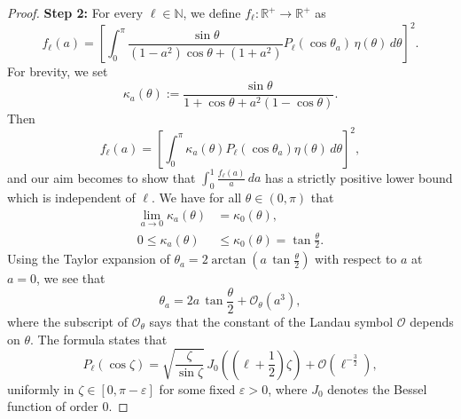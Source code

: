 \documentclass[a4paper,11pt,DIV=11,%
abstract=on%
]{scrartcl}
\def\N{{\mathbb N}}
\def\R{{\mathbb R}}
\begin{document}
\begin{proof}
	\vspace{0.3\baselineskip}\noindent
	\textbf{Step 2:}	For every $\ell\in\N$, we define $f_\ell:\R^+\to\R^+$ as 
	\begin{equation}\label{eq:f_ell}
		f_\ell(a)
		=\left[	\int_{0}^{\pi} 
		\frac{\sin\theta}{(1-a^2)\cos\theta+(1+a^2)} P_\ell(\cos\theta_a)\, \eta(\theta)\,
		d\theta \right]^2.
	\end{equation}
	For brevity, we set
	\begin{equation*}
		\kappa_a(\theta)
		:=\frac{\sin\theta}{1+\cos\theta+a^2(1-\cos\theta)}.
	\end{equation*}
	Then 
	$$f_\ell(a)
	=\left[ \int_0^\pi \kappa_a(\theta) P_\ell(\cos\theta_a) \eta(\theta)\, d\theta \right]^2,$$
	and our aim becomes to show that $\int_0^1 \frac{f_\ell(a)}{a} \,da$ has a strictly positive
	lower bound which is independent of $\ell$. We have for all $\theta\in(0,\pi)$ that
	\begin{align}
		\lim_{a\to 0}\kappa_a(\theta)
		&=\kappa_0(\theta)\label{eq:k-lim},\\
		0\leq \kappa_a(\theta)
		&\leq \kappa_0(\theta)=\tan\frac\theta2.\label{eq:k-bound}
	\end{align}
	Using the Taylor expansion of $\theta_a = 2\arctan\left(a\, \tan\frac{\theta}{2}\right)$ with
	respect to $a$ at $a=0$, we see that
	\begin{equation}
		\theta_a = 2a\, \tan\frac\theta2 + \mathcal{O}_\theta(a^3),
		\label{eq:xi-approx}
	\end{equation}
	where the subscript of $\mathcal{O}_\theta$ says that the constant of the Landau symbol $\mathcal{O}$
	depends on $\theta$. The formula \cite[Theorem 8.21.6]{Sz} states that
	\begin{equation*}
		P_\ell(\cos\zeta)
		= \sqrt{\frac{\zeta}{\sin\zeta}}\, J_0\left(\left(\ell+\frac12\right)\zeta\right)
		+ \mathcal O(\ell^{-\frac32}),
	\end{equation*}
	uniformly in $\zeta\in[0, \pi-\varepsilon]$ for some fixed $\varepsilon>0$, where $J_0$ denotes
	the Bessel function of order $0$.
	

\end{proof}
\end{document}
